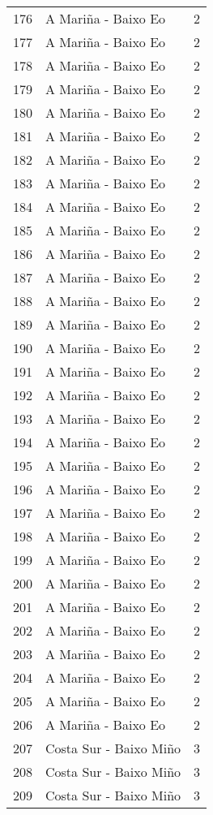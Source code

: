\begin{table}[p]
\begin{tabular}{rlr}
  176 & A Mariña - Baixo Eo &   2 \\ 
  177 & A Mariña - Baixo Eo &   2 \\ 
  178 & A Mariña - Baixo Eo &   2 \\ 
  179 & A Mariña - Baixo Eo &   2 \\ 
  180 & A Mariña - Baixo Eo &   2 \\ 
  181 & A Mariña - Baixo Eo &   2 \\ 
  182 & A Mariña - Baixo Eo &   2 \\ 
  183 & A Mariña - Baixo Eo &   2 \\ 
  184 & A Mariña - Baixo Eo &   2 \\ 
  185 & A Mariña - Baixo Eo &   2 \\ 
  186 & A Mariña - Baixo Eo &   2 \\ 
  187 & A Mariña - Baixo Eo &   2 \\ 
  188 & A Mariña - Baixo Eo &   2 \\ 
  189 & A Mariña - Baixo Eo &   2 \\ 
  190 & A Mariña - Baixo Eo &   2 \\ 
  191 & A Mariña - Baixo Eo &   2 \\ 
  192 & A Mariña - Baixo Eo &   2 \\ 
  193 & A Mariña - Baixo Eo &   2 \\ 
  194 & A Mariña - Baixo Eo &   2 \\ 
  195 & A Mariña - Baixo Eo &   2 \\ 
  196 & A Mariña - Baixo Eo &   2 \\ 
  197 & A Mariña - Baixo Eo &   2 \\ 
  198 & A Mariña - Baixo Eo &   2 \\ 
  199 & A Mariña - Baixo Eo &   2 \\ 
  200 & A Mariña - Baixo Eo &   2 \\ 
  201 & A Mariña - Baixo Eo &   2 \\ 
  202 & A Mariña - Baixo Eo &   2 \\ 
  203 & A Mariña - Baixo Eo &   2 \\ 
  204 & A Mariña - Baixo Eo &   2 \\ 
  205 & A Mariña - Baixo Eo &   2 \\ 
  206 & A Mariña - Baixo Eo &   2 \\ 
  207 & Costa Sur - Baixo Miño &   3 \\ 
  208 & Costa Sur - Baixo Miño &   3 \\ 
  209 & Costa Sur - Baixo Miño &   3 \\ 

\end{tabular}
\end{table}
